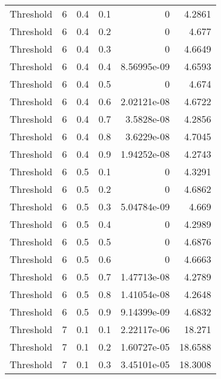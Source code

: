 \documentclass{article}
\begin{document}
\begin{longtable}[H]{lrrrrr}
 Threshold      &       6 &   0.4 &            0.1 &   0           &          4.2861 \\
 Threshold      &       6 &   0.4 &            0.2 &   0           &          4.677  \\
 Threshold      &       6 &   0.4 &            0.3 &   0           &          4.6649 \\
 Threshold      &       6 &   0.4 &            0.4 &   8.56995e-09 &          4.6593 \\
 Threshold      &       6 &   0.4 &            0.5 &   0           &          4.674  \\
 Threshold      &       6 &   0.4 &            0.6 &   2.02121e-08 &          4.6722 \\
 Threshold      &       6 &   0.4 &            0.7 &   3.5828e-08  &          4.2856 \\
 Threshold      &       6 &   0.4 &            0.8 &   3.6229e-08  &          4.7045 \\
 Threshold      &       6 &   0.4 &            0.9 &   1.94252e-08 &          4.2743 \\
 Threshold      &       6 &   0.5 &            0.1 &   0           &          4.3291 \\
 Threshold      &       6 &   0.5 &            0.2 &   0           &          4.6862 \\
 Threshold      &       6 &   0.5 &            0.3 &   5.04784e-09 &          4.669  \\
 Threshold      &       6 &   0.5 &            0.4 &   0           &          4.2989 \\
 Threshold      &       6 &   0.5 &            0.5 &   0           &          4.6876 \\
 Threshold      &       6 &   0.5 &            0.6 &   0           &          4.6663 \\
 Threshold      &       6 &   0.5 &            0.7 &   1.47713e-08 &          4.2789 \\
 Threshold      &       6 &   0.5 &            0.8 &   1.41054e-08 &          4.2648 \\
 Threshold      &       6 &   0.5 &            0.9 &   9.14399e-09 &          4.6832 \\
 Threshold      &       7 &   0.1 &            0.1 &   2.22117e-06 &         18.271  \\
 Threshold      &       7 &   0.1 &            0.2 &   1.60727e-05 &         18.6588 \\
 Threshold      &       7 &   0.1 &            0.3 &   3.45101e-05 &         18.3008 \\

\end{longtable}
\end{document}

